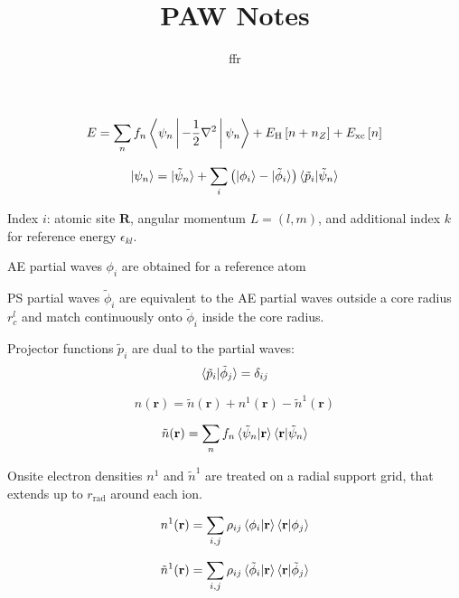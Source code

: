 \documentclass[english,10pt,aspectratio=169,fleqn]{beamer}
\begin{document}
\title{PAW Notes}
\author{ffr}
\institute{}
\date{}

\frame{\titlepage}

\begin{frame}

\begin{equation*}
E = \sum_{n} f_{n} \Braket{\psi_{n} | -\frac{1}{2}\nabla^2 | \psi_{n}} +
E_{\mathrm{H}}\left[ n + n_{Z} \right] + E_{\mathrm{xc}}\left[ n \right]
\end{equation*}

\begin{equation*}
\ket{\psi_{n}} = \ket{\tilde{\psi}_{n}} + \sum_{i} \left(
\ket{\phi_{i}} - \ket{\tilde{\phi}_{i}} \right)
\braket{ \tilde{p}_{i} | \tilde{\psi}_{n} }
\end{equation*}

Index $i$: atomic site $\mathbf{R}$, angular momentum  $L = (l,m)$, and additional
index $k$ for reference energy $\epsilon_{kl}$.

AE partial waves $\phi_{i}$ are obtained for a reference atom

PS partial waves $\tilde{\phi}_{i}$ are equivalent to the AE partial waves outside
a core radius $r^{l}_{c}$ and match continuously onto $\tilde{\phi}_{i}$ inside the
core radius.

Projector functions $\tilde{p}_{i}$ are dual to the partial waves:
\begin{equation*}
\braket{\tilde{p}_{i} | \tilde{\phi}_{j}} = \delta_{ij}
\end{equation*}

\end{frame}


\begin{frame} %

\begin{equation*}
n(\mathbf{r}) = \tilde{n}(\mathbf{r}) + n^{1}(\mathbf{r}) - \tilde{n}^{1}(\mathbf{r})
\end{equation*}

\begin{equation*}
\tilde{n}(\mathbf{r}) = \sum_{n} f_{n} \braket{\tilde{\psi}_{n} | \mathbf{r}}
\braket{\mathbf{r} | \tilde{\psi}_{n}}
\end{equation*}

Onsite electron densities $n^{1}$ and $\tilde{n}^{1}$ are treated on a radial
support grid, that extends up to $r_{\mathrm{rad}}$ around each ion.

\begin{equation*}
n^{1}(\mathbf{r}) = \sum_{i,j} \rho_{ij} \braket{\phi_{i} | \mathbf{r}}
\braket{\mathbf{r} | \phi_{j}}
\end{equation*}

\begin{equation*}
\tilde{n}^{1}(\mathbf{r}) = \sum_{i,j} \rho_{ij} \braket{\tilde{\phi}_{i} | \mathbf{r}}
  \braket{\mathbf{r} | \tilde{\phi}_{j}}
\end{equation*}


\end{frame}
\end{document}

